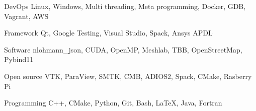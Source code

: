 

\begin{cvskills}

  \cvskill
    {DevOps} %
    {Linux, Windows, Multi threading, Meta programming, Docker, GDB, Vagrant, AWS} %

  \cvskill
    {Framework} %
    {Qt, Google Testing, Visual Studio, Spack, Ansys APDL} %

  \cvskill
    {Software} %
    {nlohmann\_json, CUDA, OpenMP, Meshlab, TBB, OpenStreetMap, Pybind11} %

  \cvskill
    {Open source} %
    {VTK, ParaView, SMTK, CMB, ADIOS2, Spack, CMake, Rasberry Pi} %

  \cvskill
    {Programming} %
    {C++, CMake, Python, Git, Bash, LaTeX, Java, Fortran} %

\end{cvskills}
